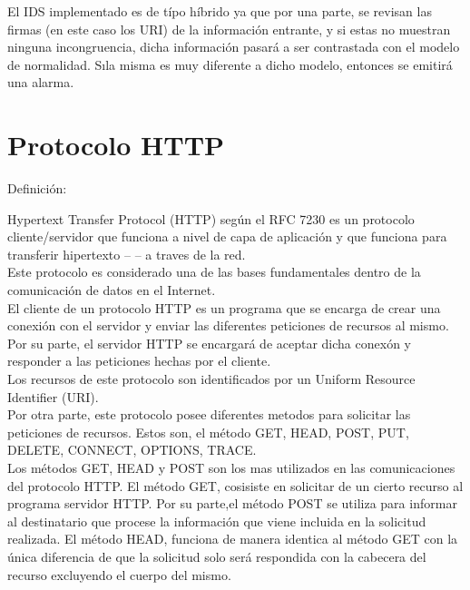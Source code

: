 \documentclass{article}
\begin{document}
El IDS implementado es de t\'ipo h\'ibrido ya que por una parte, se revisan las firmas (en este caso los URI) de la informaci\'on entrante, y si estas no muestran ninguna incongruencia, dicha informaci\'on pasar\'a a ser contrastada con el modelo de normalidad. S\i la misma es muy diferente a dicho modelo, entonces se emitir\'a una alarma.\\

\section{Protocolo HTTP}

Definici\'on:

Hypertext Transfer Protocol (HTTP) seg\'un el RFC 7230 es un protocolo cliente/servidor que funciona a nivel de capa de aplicaci\'on y que funciona para transferir hipertexto -- -- a traves de la red.\\

 Este protocolo es considerado una de las bases fundamentales dentro de la comunicaci\'on de datos en el Internet.\\
 
 El cliente de un protocolo HTTP es un programa que se encarga de crear una conexi\'on con el servidor y enviar las diferentes peticiones de recursos al mismo. Por su parte, el servidor HTTP se encargar\'a de aceptar dicha conex\'on y responder a las peticiones hechas por el cliente.\\
 
Los recursos de este protocolo son identificados por un Uniform Resource Identifier (URI).\\

Por otra parte, este protocolo posee diferentes metodos para solicitar las peticiones de recursos. Estos son, el m\'etodo GET, HEAD, POST, PUT, DELETE, CONNECT, OPTIONS, TRACE. \\

Los m\'etodos GET, HEAD y POST son los mas utilizados en las comunicaciones del protocolo HTTP. El m\'etodo GET, cosisiste en solicitar de un cierto recurso al programa servidor HTTP. Por su parte,el m\'etodo POST se utiliza para informar al destinatario que procese la informaci\'on que viene incluida en la solicitud realizada. El m\'etodo HEAD, funciona de manera identica al m\'etodo GET con la \'unica diferencia de que la solicitud solo ser\'a respondida con la cabecera del recurso excluyendo el cuerpo del mismo.\\

    
\end{document}
